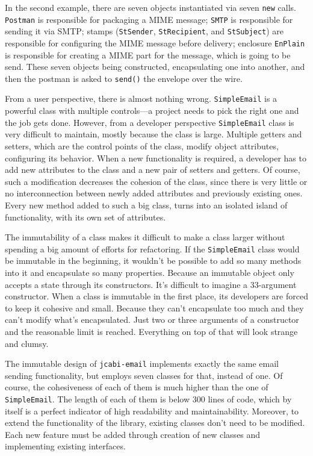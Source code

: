 \documentclass[3p,times,procedia]{elsarticle}
\newcommand{\code}[1]{\texttt{#1}}
\begin{document}
In the second example, there are seven objects instantiated via seven \code{new} calls.
\code{Postman} is responsible for packaging a MIME message; \code{SMTP} is
responsible for sending it via SMTP; stamps (\code{StSender}, \code{StRecipient},
and \code{StSubject}) are responsible for configuring the MIME message before
delivery; enclosure \code{EnPlain} is responsible for creating a MIME part
for the message, which is going to be send. These seven objects being constructed,
encapsulating one into another, and then the postman is asked to \code{send()}
the envelope over the wire.

From a user perspective, there is almost nothing wrong. \code{SimpleEmail} is a powerful
class with multiple controls---a project needs to pick the right one and the job
gets done. However, from a developer perspective \code{SimpleEmail} class is
very difficult to maintain, mostly because the class is large.
Multiple getters and setters, which are the control points of the class, modify
object attributes, configuring its behavior. When a new functionality is
required, a developer has to add new attributes to the class and a new
pair of setters and getters. Of course, such a modification decreases the
cohesion of the class, since there is very little or no interconnection
between newly added attributes and previously existing ones. Every new method
added to such a big class, turns into an isolated island of functionality,
with its own set of attributes.

The immutability of a class makes it difficult to make a class larger
without spending a big amount of efforts for refactoring.
If the \code{SimpleEmail} class would be immutable
in the beginning, it wouldn't be possible to add so many methods into it
and encapsulate so many properties. Because an immutable object only accepts a state
through its constructors. It's difficult to imagine a 33-argument constructor.
When a class is immutable in the first place, its developers are forced
to keep it cohesive and small. Because they can't encapsulate
too much and they can't modify what's encapsulated. Just two or three
arguments of a constructor and the reasonable limit is reached. Everything
on top of that will look strange and clumsy.

The immutable design of \code{jcabi-email} implements exactly the same
email sending functionality, but employs seven classes for that, instead
of one. Of course, the cohesiveness of each of them is much higher than
the one of \code{SimpleEmail}. The length of each of them is below 300
lines of code, which by itself is a perfect indicator of high readability
and maintainability.
Moreover, to extend the functionality of the library, existing classes
don't need to be modified. Each new feature must be added through
creation of new classes and implementing existing interfaces.
\end{document}
